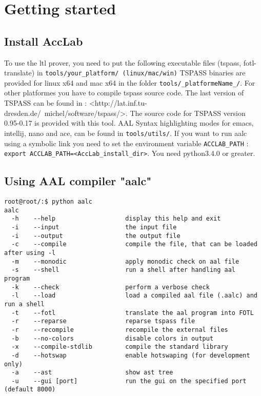 \section{Getting started}

\subsection{Install AccLab}
To use the ltl prover, you need to put the following executable files (tspass, fotl-translate) in
\texttt{tools/your\_platform/ (linux/mac/win)}
TSPASS binaries are provided for linux x64 and mac x64 in the folder \texttt{tools/\_platformeName\_/}.
For other platformes you have to compile tspass source code.
The last version of TSPASS can be found in :
{\small{<http://lat.inf.tu-dresden.de/~michel/software/tspass/>}}. The source code for TSPASS version 0.95-0.17
is provided with this tool.
AAL Syntax highlighting modes for emacs, intellij, nano and ace, can be found in \texttt{tools/utils/}.
If you want to run aalc using a symbolic link you need to set the environment variable \texttt{ACCLAB\_PATH} :
\texttt{export ACCLAB\_PATH=<AccLab\_install\_dir>}. You need python3.4.0 or greater.


\subsection{Using AAL compiler "aalc"}
{\lstset{style=shell}
\begin{lstlisting}[caption={aalc options}]
root@root/:$ python aalc
aalc 
  -h    --help                   display this help and exit
  -i    --input                  the input file
  -i    --output                 the output file
  -c    --compile                compile the file, that can be loaded after using -l
  -m    --monodic                apply monodic check on aal file
  -s    --shell                  run a shell after handling aal program
  -k    --check                  perform a verbose check
  -l    --load                   load a compiled aal file (.aalc) and run a shell
  -t    --fotl                   translate the aal program into FOTL
  -r    --reparse                reparse tspass file
  -r    --recompile              recompile the external files
  -b    --no-colors              disable colors in output
  -x    --compile-stdlib         compile the standard library
  -d    --hotswap                enable hotswaping (for development only)
  -a    --ast                    show ast tree
  -u    --gui [port]             run the gui on the specified port (default 8000)
\end{lstlisting}
}


